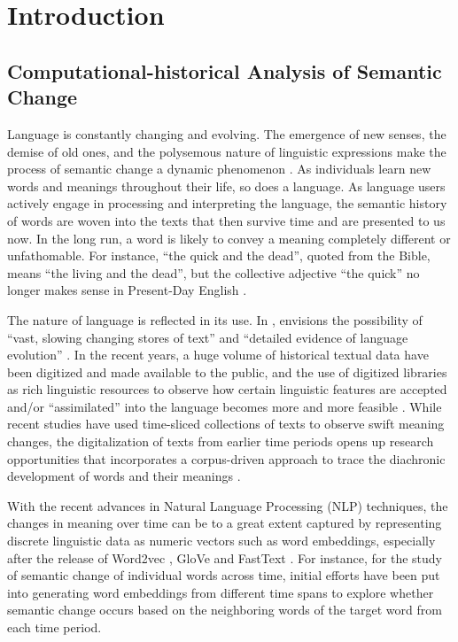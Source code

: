 

\chapter{Introduction}
\section{Computational-historical Analysis of Semantic Change}
Language is constantly changing and evolving. The emergence of new senses, the demise of old ones, and the polysemous nature of linguistic expressions make the process of semantic change a dynamic phenomenon \parencite{robertinvanhove2008}. As individuals learn new words and meanings throughout their life, so does a language. As language users actively engage in processing and interpreting the language, the semantic history of words are woven into the texts that then survive time and are presented to us now. In the long run, a word is likely to convey a meaning completely different or unfathomable. For instance, ``the quick and the dead'', quoted from the Bible, means ``the living and the dead'', but the collective adjective ``the quick'' no longer makes sense in Present-Day English \parencite[199]{semanticincrowley2010}.

The nature of language is reflected in its use. In \citeyear{sinclair1982reflections}, \citeauthor{sinclair1982reflections} envisions the possibility of ``vast, slowing changing stores of text'' and ``detailed evidence of language evolution'' . In the recent years, a huge volume of historical textual data have been digitized and made available to the public, and the use of digitized libraries as rich linguistic resources to observe how certain linguistic features are accepted and/or ``assimilated'' into the language becomes more and more feasible \parencite{renouf2002time}. While recent studies have used time-sliced collections of texts to observe swift meaning changes, the digitalization of texts from earlier time periods opens up research opportunities that incorporates a corpus-driven approach to trace the diachronic development of words and their meanings \parencite{kutuzov2018survey,tahmasebi2018survey,camacho2018survey}.

With the recent advances in Natural Language Processing (NLP) techniques, the changes in meaning over time can be to a great extent captured by representing discrete linguistic data as numeric vectors such as word embeddings, especially after the release of Word2vec \parencite{mikolov2013efficient}, GloVe \parencite{pennington2014glove} and FastText \parencite{bojanowski2016enriching}. For instance, for the study of semantic change of individual words across time, initial efforts have been put into generating word embeddings from different time spans to explore whether semantic change occurs based on the neighboring words of the target word from each time period.

